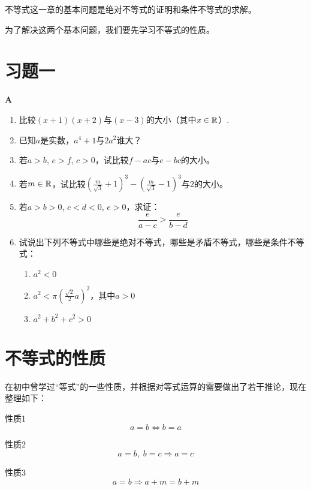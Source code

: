不等式这一章的基本问题是绝对不等式的证明和条件不等式的求解。

为了解决这两个基本问题，我们要先学习不等式的性质。

\section*{习题一}
\begin{center}
    \bfseries A
\end{center}

\begin{enumerate}
    \item 比较$(x+1)(x+2)$与$(x-3)$的大小（其中$x\in\mathbb{R}$）.
    \item 已知$a$是实数，$a^4+1$与$2a^2$谁大？
    \item 若$a>b$, $e>f$, $c>0$，试比较$f-ac$与$e-bc$的大小。
    \item 若$m\in\mathbb{R}$，试比较$\left(\frac{m}{\sqrt{3}}+1\right)^3-\left(\frac{m}{\sqrt{3}}-1\right)^3$与2的大小。
    \item 若$a>b>0$, $c<d<0$, $e>0$，求证：
    \[\frac{e}{a-c}>\frac{e}{b-d}\]
    \item 试说出下列不等式中哪些是绝对不等式，哪些是矛盾不等式，哪些是条件不等式：
\begin{enumerate}[(1)]
    \item $a^2<0$
    \item $a^2<\pi\left(\frac{\sqrt{2}}{2}a\right)^2$，其中$a>0$
    \item $a^2+b^2+c^2>0$
\end{enumerate}
\end{enumerate}

\section{不等式的性质}
在初中曾学过“等式”的一些性质，并根据对等式运算的需要做出了若干推论，现在整理如下：
\begin{thm}{性质1}
$$a=b\Longleftrightarrow b=a$$
\end{thm}

\begin{thm}{性质2}
\begin{equation}
    a=b,\; b=c\Longrightarrow a=c \tag{传递性}
\end{equation}
\end{thm}

\begin{thm}{性质3}
    \begin{equation}
        a=b\Longrightarrow a+m=b+m\tag{等量加同量}
    \end{equation}
\end{thm}

